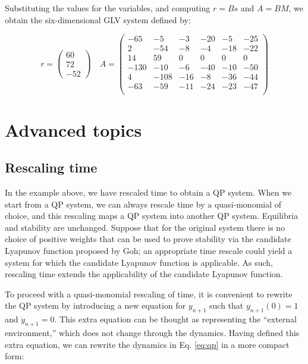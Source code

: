 \documentclass{article}
\begin{document}
Substituting the values for the variables, and computing \(r = Bs\) and
\(A = B M\), we obtain the six-dimensional GLV system defined by:

\begin{equation}
r = \begin{pmatrix} 60 \\ 72 \\ -52 \end{pmatrix} \quad
A = \begin{pmatrix}
 -65 & -5 & -3 & -20 & -5 & -25 \\
 2 & -54 & -8 & -4 & -18 & -22 \\
 14 & 59 & 0 & 0 & 0 & 0 \\
 -130 & -10 & -6 & -40 & -10 & -50 \\
 4 & -108 & -16 & -8 & -36 & -44 \\
 -63 & -59 & -11 & -24 & -23 & -47 \\
\end{pmatrix}
\end{equation}

\hypertarget{advanced-topics}{%
\section{Advanced topics}\label{advanced-topics}}

\hypertarget{rescaling-time}{%
\subsection{Rescaling time}\label{rescaling-time}}

In the example above, we have rescaled time to obtain a QP system. When
we start from a QP system, we can always rescale time by a
quasi-monomial of choice, and this rescaling maps a QP system into
another QP system. Equilibria and stability are unchanged. Suppose that
for the original system there is no choice of positive weights that can
be used to prove stability via the candidate Lyapunov function proposed
by Goh; an appropriate time rescale could yield a system for which the
candidate Lyapunov function is applicable. As such, rescaling time
extends the applicability of the candidate Lyapunov function.

To proceed with a quasi-monomial rescaling of time, it is convenient to
rewrite the QP system by introducing a new equation for \(y_{n+1}\) such
that \(y_{n+1}(0) = 1\) and \(\dot{y}_{n+1} = 0\). This extra equation
can be thought as representing the ``external environment,'' which does
not change through the dynamics. Having defined this extra equation, we
can rewrite the dynamics in Eq. \ref{eq:qp} in a more compact form:
\end{document}
